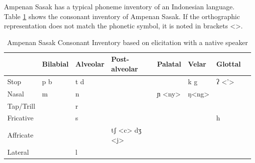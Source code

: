 \documentclass[12pt]{ouparticle}
\begin{document}


Ampenan Sasak has a typical phoneme inventory of an Indonesian language. Table \ref{tab:sasak_consonants} shows the consonant inventory of Ampenan Sasak. If the orthographic representation does not match the phonetic symbol, it is noted in brackets <>. 

\begin{table}[ht]
\centering
\caption{Ampenan Sasak Consonant Inventory based on elicitation with a native speaker}
\label{tab:sasak_consonants}
\begin{tabular}{l | l l l l l l l}
	& Bilabial  & Alveolar & Post-alveolar & Palatal & Velar & Glottal  \\
\hline
Stop & p b & t d & & & k g & ʔ <’> \\
Nasal & m & n & & ɲ <ny> & ŋ<ng> &\\
Tap/Trill & & r & & & & & \\
Fricative & & s & & & & h \\
Affricate & & & tʃ <c> dʒ <j> & & & \\
Lateral & & l & & & & & \\
\end{tabular}
\end{table}
\end{document}
